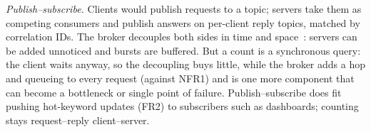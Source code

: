 \emph{Publish--subscribe.} Clients would publish requests to a topic; servers
take them as competing consumers and publish answers on per-client reply topics,
matched by correlation IDs. The broker decouples both sides in time and
space~\cite{eugster2003pubsub}: servers can be added unnoticed and bursts are
buffered. But a count is a synchronous query: the client waits anyway, so the
decoupling buys little, while the broker adds a hop and queueing to every request
(against NFR1) and is one more component that can become a bottleneck or single
point of failure. Publish--subscribe does fit pushing hot-keyword updates (FR2) to
subscribers such as dashboards; counting stays request--reply client--server.
